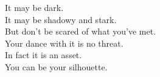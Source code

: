 It may be dark. \\
It may be shadowy and stark. \\
But don't be scared of what you've met. \\
Your dance with it is no threat. \\
In fact it is an asset. \\
You can be your silhouette. \\




